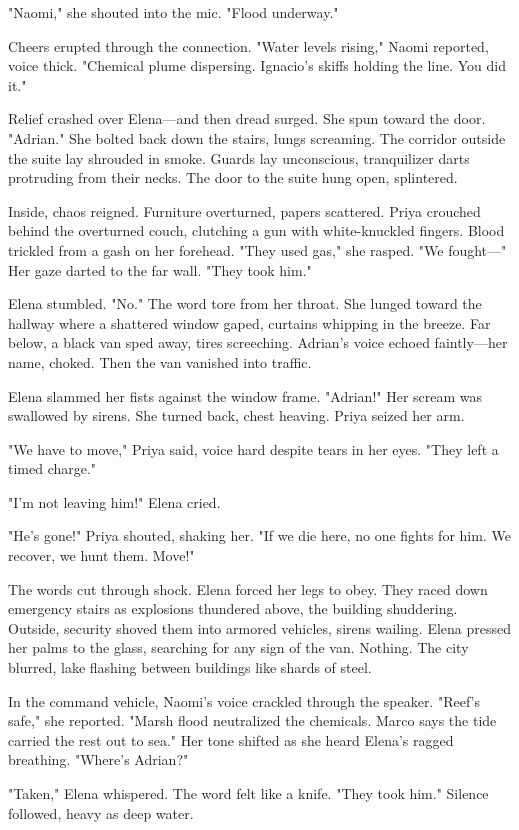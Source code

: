 "Naomi," she shouted into the mic. "Flood underway."

Cheers erupted through the connection. "Water levels rising," Naomi reported, voice thick. "Chemical plume dispersing. Ignacio's skiffs holding the line. You did it."

Relief crashed over Elena—and then dread surged. She spun toward the door. "Adrian." She bolted back down the stairs, lungs screaming. The corridor outside the suite lay shrouded in smoke. Guards lay unconscious, tranquilizer darts protruding from their necks. The door to the suite hung open, splintered.

Inside, chaos reigned. Furniture overturned, papers scattered. Priya crouched behind the overturned couch, clutching a gun with white-knuckled fingers. Blood trickled from a gash on her forehead. "They used gas," she rasped. "We fought—" Her gaze darted to the far wall. "They took him."

Elena stumbled. "No." The word tore from her throat. She lunged toward the hallway where a shattered window gaped, curtains whipping in the breeze. Far below, a black van sped away, tires screeching. Adrian's voice echoed faintly—her name, choked. Then the van vanished into traffic.

Elena slammed her fists against the window frame. "Adrian!" Her scream was swallowed by sirens. She turned back, chest heaving. Priya seized her arm.

"We have to move," Priya said, voice hard despite tears in her eyes. "They left a timed charge."

"I'm not leaving him!" Elena cried.

"He's gone!" Priya shouted, shaking her. "If we die here, no one fights for him. We recover, we hunt them. Move!"

The words cut through shock. Elena forced her legs to obey. They raced down emergency stairs as explosions thundered above, the building shuddering. Outside, security shoved them into armored vehicles, sirens wailing. Elena pressed her palms to the glass, searching for any sign of the van. Nothing. The city blurred, lake flashing between buildings like shards of steel.

In the command vehicle, Naomi's voice crackled through the speaker. "Reef's safe," she reported. "Marsh flood neutralized the chemicals. Marco says the tide carried the rest out to sea." Her tone shifted as she heard Elena's ragged breathing. "Where's Adrian?"

"Taken," Elena whispered. The word felt like a knife. "They took him." Silence followed, heavy as deep water.

